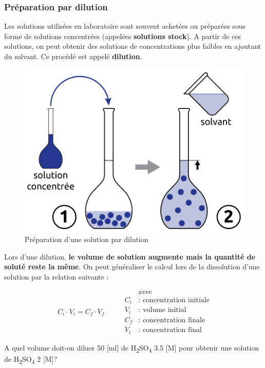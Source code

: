 \documentclass[
  11pt,
  french,
  a4paper,
  openany]{book}
\begin{document}
\hypertarget{pruxe9paration-par-dilution}{%
\subsubsection{Préparation par dilution}\label{pruxe9paration-par-dilution}}

Les solutions utilisées en laboratoire sont souvent achetées ou préparées sous forme de solutions concentrées (appelées \textbf{solutions stock}). A partir de ces solutions, on peut obtenir des solutions de concentrations plus faibles en ajoutant du solvant. Ce procédé est appelé \textbf{dilution}.

\begin{figure}

{\centering \includegraphics[width=0.33\linewidth]{images/preparation-2} 

}

\caption{Préparation d'une solution par dilution}\label{fig:preparation-2}
\end{figure}

Lors d'une dilution, \textbf{le volume de solution augmente mais la quantité de soluté reste la même}. On peut généraliser le calcul lors de la dissolution d'une solution par la relation suivante :

\[
\begin{split}
C_i \cdot V_i = C_f \cdot V_f
\end{split}
\qquad
\begin{split}
  & \text{avec} \\
  C_i & \text{: concentration initiale} \\
  V_i & \text{: volume initial} \\
  C_f & \text{: concentration finale} \\
  V_i & \text{: concentration final}
\end{split}
\]

\newpage

\begin{Exercise}
A quel volume doit-on diluer 50 {[}ml{]} de H\textsubscript{2}SO\textsubscript{4} 3.5 {[}M{]} pour obtenir une solution de H\textsubscript{2}SO\textsubscript{4} 2 {[}M{]}?

\end{Exercise}
\end{document}
